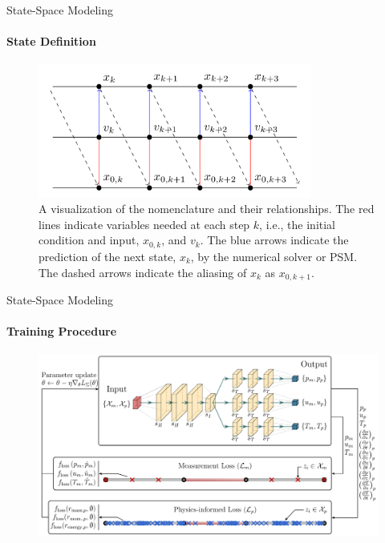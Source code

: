 \begin{frame}{State-Space Modeling}
\framesubtitle{State Definition}
\begin{figure}[H]
    \centering
    \includegraphics[width=0.8\textwidth]{img/psm.png}
    \caption{A visualization of the nomenclature and their relationships. The red lines indicate variables needed at each step \(k\), i.e., the initial condition and input, \(x_{0,k}\), and \(v_k\). The blue arrows indicate the prediction of the next state, \(x_k\), by the numerical solver or PSM. The dashed arrows indicate the aliasing of \(x_k\) as \(x_{0,k+1}\).}
\end{figure}
\end{frame}
    
\begin{frame}{State-Space Modeling}
\framesubtitle{Training Procedure}
\begin{figure}[H]
    \centering
    \includegraphics[width=1\textwidth]{img/psm-train.png}
\end{figure}
\end{frame}
    
